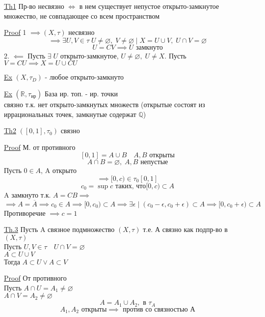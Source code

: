 \documentclass[a4paper]{article}
\begin{document}
\begin{tcolorbox}
\underline{Th1} Пр-во несвязно $ \iff $ в нем существует непустое открыто-замкнутое
множество, не совпадающее со всем пространством

\underline{Proof} 1 $ \implies (X, \tau) $ несвязно
\[
    \implies \exists U, V \in \tau\; U \neq \varnothing, \; V \neq \varnothing \; |
    \; X = U \cup V, \; U \cap V = \varnothing
\]
\[
    U = CV \implies U \text{ замкнуто}
\]
2. $ \impliedby $ Пусть $ \exists \; U $ открыто-замкнутое, $ U \neq \varnothing, \;
U \neq X$. Пусть $ V = CU \implies X = U \cup CU $  
\end{tcolorbox}

\underline{Ex} $ (X, \tau_{D}) $ - любое открыто-замкнуто 

\underline{Ex} $ (\mathbb{R}, \tau_{ир}) $ База ир. топ. - ир. точки\\
связно т.к. нет открыто-замкнутых множеств (открытые состоят из иррациональных
точек, замкнутые содержат $ \mathbb{Q} $)

\begin{tcolorbox}
    \underline{Th2} $ ([0,1], \tau_{0}) $ связно

    \underline{Proof} М. от противного\\
    \[
        [0,1] = A \cup B \quad A, B \text{ открыты}
    \]
    \[
        A \cap B = \varnothing, \; A,B \text{ непустые}
    \]
    Пусть $ 0 \in A $, A открыто 
    \[
        \implies [0, c) \in \tau_{0}[0,1]
    \]
    \[
        c_0 = \sup c \text{ таких, что} [0,c) \subset A
    \]
    A замкнуто т.к. $ A = CB  \implies$ 
    \[
        \implies A = \overline{A} \implies c_0 \in A \implies [0, c_0) \subset A
        \implies \exists \epsilon \; | \; (c_0 - \epsilon, c_0 + \epsilon) \subset A
        \implies [0, c_0 + \epsilon) \subset A
    \]
    Противоречие $ \implies c = 1 $ 
\end{tcolorbox}

\begin{tcolorbox}
\underline{Th.3} Пусть A связное подмножество $ (X, \tau) $ т.е. А связно как
подпр-во в $ (X, \tau) $\\
Пусть $U,V \in \tau \quad U \cap V =\varnothing $\\
$ A \subset U \cup V $ \\
Тогда $ A \subset U \lor A \subset V $ 

\underline{Proof} От противного\\
Пусть $ A \cap U = A_1 \neq \varnothing $ \\
$ A \cap V = A_2 \neq \varnothing $ 
\[
    A = A_1 \cup A_2, \text{ в } \tau_{A}
\]
\[
    A_1, A_2 \text{ открыты} \implies \text{ против со связностью А}
\]
\end{tcolorbox}
\end{document}
